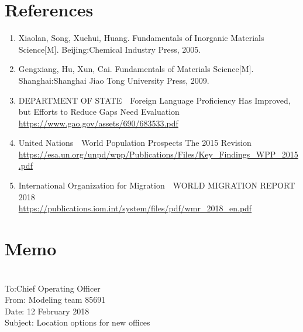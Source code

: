 \documentclass{mcmthesis}
\begin{document}
  \section*{References}
  \begin{enumerate}
  \item Xiaolan, Song, Xuehui, Huang. Fundamentals of Inorganic Materials Science[M]. Beijing:Chemical Industry Press, 2005.
  \item Gengxiang, Hu, Xun, Cai. Fundamentals of Materials Science[M]. Shanghai:Shanghai Jiao Tong University Press, 2009.
  \item DEPARTMENT OF STATE\ \ Foreign Language Proficiency Has Improved, but Efforts to Reduce Gaps Need Evaluation \\
  \url{https://www.gao.gov/assets/690/683533.pdf}\\
  \item United Nations\ \ World Population Prospects The 2015 Revision \\
  \url{https://esa.un.org/unpd/wpp/Publications/Files/Key_Findings_WPP_2015.pdf}\\
  \item International Organization for Migration\ \ WORLD MIGRATION REPORT 2018 \\
  \url{https://publications.iom.int/system/files/pdf/wmr_2018_en.pdf}\\
  \end{enumerate}

  \section*{Memo}
  \ \\
  To:Chief Operating Officer\\
  From: Modeling team 85691\\
  Date: 12 February 2018\\
  Subject: Location options for new offices\\
\end{document}
